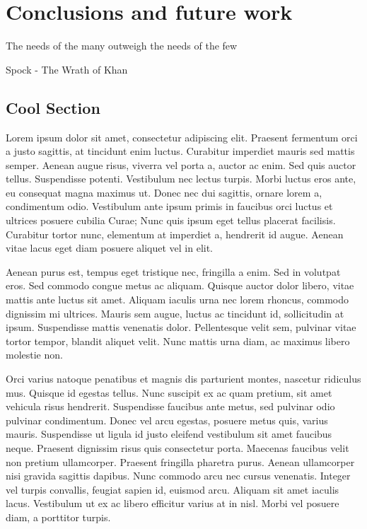 \chapter{Conclusions and future work}

\begin{FraseCelebre}
  \begin{Frase}
    The needs of the many outweigh the needs of the few
  \end{Frase}
  \begin{Fuente}
    Spock - The Wrath of Khan
  \end{Fuente}
\end{FraseCelebre}

\section{Cool Section}

Lorem ipsum dolor sit amet, consectetur adipiscing elit. Praesent fermentum orci
a justo sagittis, at tincidunt enim luctus. Curabitur imperdiet mauris sed
mattis semper. Aenean augue risus, viverra vel porta a, auctor ac enim. Sed quis
auctor tellus. Suspendisse potenti. Vestibulum nec lectus turpis. Morbi luctus
eros ante, eu consequat magna maximus ut. Donec nec dui sagittis, ornare lorem
a, condimentum odio. Vestibulum ante ipsum primis in faucibus orci luctus et
ultrices posuere cubilia Curae; Nunc quis ipsum eget tellus placerat facilisis.
Curabitur tortor nunc, elementum at imperdiet a, hendrerit id augue. Aenean
vitae lacus eget diam posuere aliquet vel in elit.

Aenean purus est, tempus eget tristique nec, fringilla a enim. Sed in volutpat
eros. Sed commodo congue metus ac aliquam. Quisque auctor dolor libero, vitae
mattis ante luctus sit amet. Aliquam iaculis urna nec lorem rhoncus, commodo
dignissim mi ultrices. Mauris sem augue, luctus ac tincidunt id, sollicitudin at
ipsum. Suspendisse mattis venenatis dolor. Pellentesque velit sem, pulvinar
vitae tortor tempor, blandit aliquet velit. Nunc mattis urna diam, ac maximus
libero molestie non.

Orci varius natoque penatibus et magnis dis parturient montes, nascetur
ridiculus mus. Quisque id egestas tellus. Nunc suscipit ex ac quam pretium, sit
amet vehicula risus hendrerit. Suspendisse faucibus ante metus, sed pulvinar
odio pulvinar condimentum. Donec vel arcu egestas, posuere metus quis, varius
mauris. Suspendisse ut ligula id justo eleifend vestibulum sit amet faucibus
neque. Praesent dignissim risus quis consectetur porta. Maecenas faucibus velit
non pretium ullamcorper. Praesent fringilla pharetra purus. Aenean ullamcorper
nisi gravida sagittis dapibus. Nunc commodo arcu nec cursus venenatis. Integer
vel turpis convallis, feugiat sapien id, euismod arcu. Aliquam sit amet iaculis
lacus. Vestibulum ut ex ac libero efficitur varius at in nisl. Morbi vel posuere
diam, a porttitor turpis.

